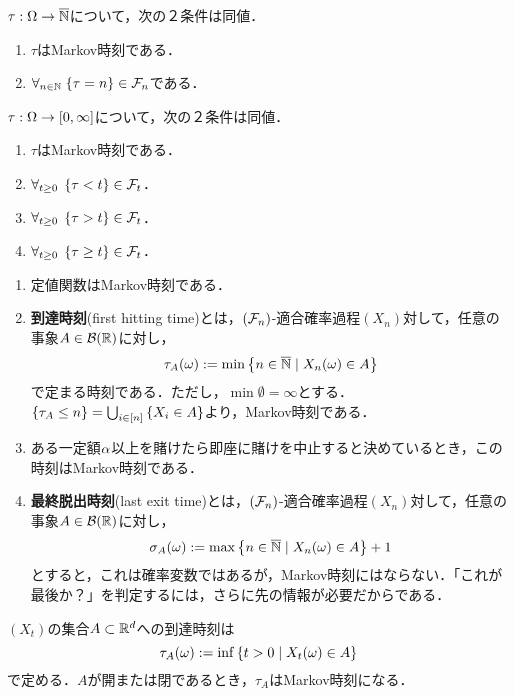 \documentclass[uplatex,dvipdfmx]{jsreport}
\begin{document}
\begin{lemma}[離散の場合の特徴付け]
    $\tau:\Omega\to\overline{\mathbb{N}}$について，次の２条件は同値．
    \begin{enumerate}
        \item $\tau$はMarkov時刻である．
        \item $\forall_{n\in\mathbb{N}}\;\{\tau=n\}\in\mathcal{F}_n$である．
    \end{enumerate}
\end{lemma}

\begin{lemma}[連続の場合の特徴付け]
    $\tau:\Omega\to[0,\infty]$について，次の２条件は同値．
    \begin{enumerate}
        \item $\tau$はMarkov時刻である．
        \item $\forall_{t\ge0}\;\left\{\tau<t\right\}\in\mathcal{F}_t$．
        \item $\forall_{t\ge0}\;\left\{\tau>t\right\}\in\mathcal{F}_t$．
        \item $\forall_{t\ge0}\;\left\{\tau\ge t\right\}\in\mathcal{F}_t$．
    \end{enumerate}
\end{lemma}

\begin{example}[離散の例]\label{exp-discrete-Markov-time}\mbox{}
    \begin{enumerate}
        \item 定値関数はMarkov時刻である．
        \item \textbf{到達時刻}(first hitting time)とは，$(\mathcal{F}_n)$-適合確率過程$(X_n)$対して，任意の事象$A\in\mathcal{B}(\mathbb{R})$に対し，
        \[\tau_A(\omega):=\min\left\{n\in\overline{\mathbb{N}}\mid X_n(\omega)\in A\right\}\]
        で定まる時刻である．ただし，$\min\emptyset=\infty$とする．
        $\{\tau_A\le n\}=\bigcup_{i\in[n]}\left\{X_i\in A\right\}$より，Markov時刻である．
        \item ある一定額$\alpha$以上を賭けたら即座に賭けを中止すると決めているとき，この時刻はMarkov時刻である．
        \item \textbf{最終脱出時刻}(last exit time)とは，$(\mathcal{F}_n)$-適合確率過程$(X_n)$対して，任意の事象$A\in\mathcal{B}(\mathbb{R})$に対し，
        \[\sigma_A(\omega):=\max\left\{n\in\overline{\mathbb{N}}\mid X_n(\omega)\in A\right\}+1\]
        とすると，これは確率変数ではあるが，Markov時刻にはならない．「これが最後か？」を判定するには，さらに先の情報が必要だからである．
    \end{enumerate}
\end{example}

\begin{example}
    $(X_t)$の集合$A\subset\mathbb{R}^d$への到達時刻は
    \[\tau_A(\omega):=\inf\left\{t>0\mid X_t(\omega)\in A\right\}\]
    で定める．$A$が開または閉であるとき，$\tau_A$はMarkov時刻になる．
\end{example}
\end{document}
